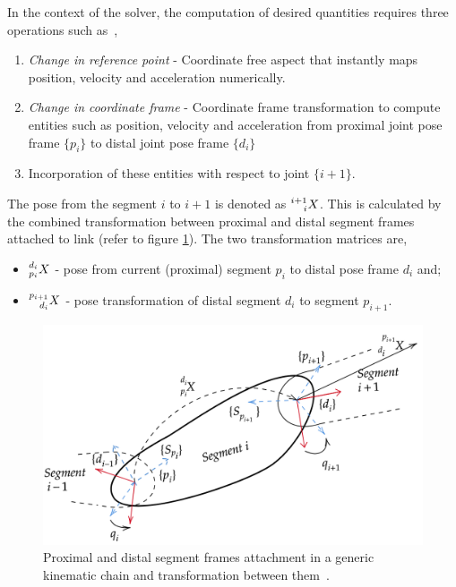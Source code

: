 In the context of the solver, the computation of desired quantities requires three operations such as~\cite{shakhimardanov2015composable}, 
\begin{enumerate}
	\item \textit{Change in reference point} - Coordinate free aspect that instantly maps position, velocity and acceleration numerically.
	\item \textit{Change in coordinate frame} - Coordinate frame transformation to compute entities such as position, velocity and acceleration from proximal joint pose frame $\{p_i\}$ to distal joint pose frame $\{d_i\}$
	\item Incorporation of these entities with respect to joint $\{i+1\}$.
\end{enumerate}

The pose from the segment $i$ to $i+1$ is denoted as $\prescript{i+1}{i}{X}$. This is calculated by the combined transformation between proximal and distal segment frames attached to link (refer to figure \ref{fig:pose}). The two transformation matrices are, \begin{itemize}
	\item $\prescript{d_i}{p_i}{X}$ - pose from current (proximal) segment $p_i$ to distal pose frame $d_i$ and;
	\item $\prescript{p_{i+1}}{d_i}{X}$ - pose transformation of distal segment $d_i$ to segment $p_{i+1}$. 
\end{itemize} 

\begin{figure}[h!]
		\label{fig:pose}
	\centering
	\includegraphics[scale=0.33]{images/pose.png}
	\caption{Proximal and distal segment frames attachment in a generic kinematic chain and transformation between them~\cite{shakhimardanov2015composable}.}

\end{figure}

